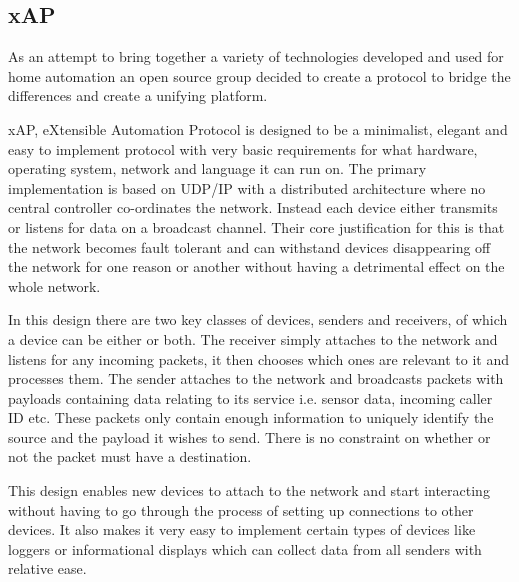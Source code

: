 \documentclass{l4proj}
\begin{document}
\subsection{xAP} %
\label{sub:xap}
\cite{xAP}
As an attempt to bring together a variety of technologies developed and used for home automation an open source group decided to create a protocol to bridge the differences and create a unifying platform.

xAP, eXtensible Automation Protocol is designed to be a minimalist, elegant and easy to implement protocol with very basic requirements for what hardware, operating system, network and language it can run on.  
The primary implementation is based on UDP/IP with a distributed architecture where no central controller co-ordinates the network. Instead each device either transmits or listens for data on a broadcast channel.
Their core justification for this is that the network becomes fault tolerant and can withstand devices disappearing off the network for one reason or another without having a detrimental effect on the whole network.

In this design there are two key classes of devices, senders and receivers, of which a device can be either or both. 
The receiver simply attaches to the network and listens for any incoming packets, it then chooses which ones are relevant to it and processes them.
The sender attaches to the network and broadcasts packets with payloads containing data relating to its service i.e. sensor data, incoming caller ID etc. These packets only contain enough information to uniquely identify the source and the payload it wishes to send. There is no constraint on whether or not the packet must have a destination.

This design enables new devices to attach to the network and start interacting without having to go through the process of setting up connections to other devices. It also makes it very easy to implement certain types of devices like loggers or informational displays which can collect data from all senders with relative ease.

\begin{comment}
Core Idea is to build a distributed fault tolerant IoT protocol.
total broadcasting protocol, every device just beams out its own services and any device on the network can read and interpret the data.
Can be very inefficient for devices on battery(constant barrage) and doesn't scale well with 10's, 100's, 1000's of devices.
Designed to be hardware and link agnostic and to co-exist with other protocols. Basic implementation over UDP without any care for reliability AT ALL.

Purpose is that devices can hop on and off the network without breaking/severing the entire network.

Nice concepts and goals
BUT fails to deliver a system which can scale and do things efficiently
\end{comment}
\end{document}
